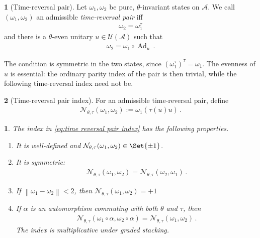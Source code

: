 \documentclass[a4paper,10pt]{article}
\numberwithin{equation}{section}
\theoremstyle{plain}
\newtheorem{thm}{\protect\theoremname}[section]
\theoremstyle{plain}
\theoremstyle{plain}
\theoremstyle{plain}
\theoremstyle{plain}
\theoremstyle{remark}
\theoremstyle{definition}
\newtheorem{defn}[defn]{\protect\definitionname}
\providecommand{\definitionname}{Definition}
\providecommand{\theoremname}{Theorem}
\newcommand{\calA}{\mathcal{A}}
\newcommand{\calN}{\mathcal{N}}
\newcommand{\calU}{\mathcal{U}}
\newcommand\norm[1]{\left\lVert#1\right\rVert}
\newcommand{\Ad}[1]{\operatorname{Ad}_{#1}}
\newcommand{\eq}[1]{\begin{align*}#1\end{align*}}
\newcommand{\eql}[1]{\begin{align}#1\end{align}}
\newcommand{\br}[1]{\left(#1\right)}
\begin{document}
\begin{defn}[Time-reversal pair]
    Let $\omega_1,\omega_2$ be pure, $\theta$-invariant states on
    $\calA$. We call $(\omega_1,\omega_2)$ an admissible
    \emph{time-reversal pair} iff
    \eq{
        \omega_2=\omega_1^\tau
    }
    and there is a $\theta$-even unitary $u\in\calU(\calA)$ such that
    \eq{
        \omega_2=\omega_1\circ\Ad{u}\,.
    }
\end{defn}

The condition is symmetric in the two states, since
$(\omega_1^\tau)^\tau=\omega_1$. The evenness of $u$ is essential: the
ordinary parity index of the pair is then trivial, while the following
time-reversal index need not be.

\begin{defn}[Time-reversal pair index]
    For an admissible time-reversal pair, define
    \eql{
        \calN_{\theta,\tau}(\omega_1,\omega_2)
        :=
        \omega_1\br{\tau(u)u}
        \label{eq:time reversal pair index}\,.
    }
\end{defn}

\begin{thm}
\label{thm:properties of time reversal pair index}
The index in \cref{eq:time reversal pair index} has the following
properties.
\begin{enumerate}
    \item It is well-defined and
    $\calN_{\theta,\tau}(\omega_1,\omega_2)\in\Set{\pm1}$.

    \item It is symmetric:
    \eq{
        \calN_{\theta,\tau}(\omega_1,\omega_2)
        =
        \calN_{\theta,\tau}(\omega_2,\omega_1)\,.
    }

    \item If $\norm{\omega_1-\omega_2}<2$, then
    $\calN_{\theta,\tau}(\omega_1,\omega_2)=+1$

    \item If $\alpha$ is an automorphism commuting with both $\theta$
    and $\tau$, then
    \eq{
        \calN_{\theta,\tau}(\omega_1\circ\alpha,
        \omega_2\circ\alpha)
        =
        \calN_{\theta,\tau}(\omega_1,\omega_2)\,.
    }
    The index is multiplicative under graded stacking.
\end{enumerate}
\end{thm}
\end{document}

